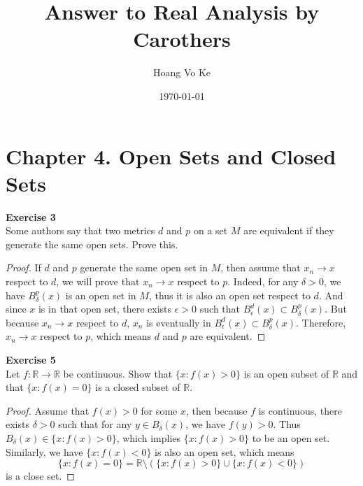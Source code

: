 \documentclass[12pt, a4paper]{article}
\title{Answer to Real Analysis by Carothers}
\author{Hoang Vo Ke}
\date{\today}
\theoremstyle{plain}
\newcommand{\R}{\mathbb{R}}
\newenvironment{exercise}[2][Exercise]
    { \begin{mdframed}[backgroundcolor=gray!20] \textbf{#1 #2} \\}
    {  \end{mdframed}}
\begin{document}
\maketitle

\section*{Chapter 4. Open Sets and Closed Sets}

\begin{exercise}{3}
Some authors say that two metrics $d$ and $p$ on a set $M$ are equivalent if they generate the same open sets. Prove this.
\end{exercise}
	\begin{proof}
	If $d$ and $p$ generate the same open set in $M$, then assume that $x_n\rightarrow x$ respect to $d$, we will prove that $x_n\rightarrow x$ respect to $p$. Indeed, for any $\delta >0$, we have $B_\delta^p(x)$ is an open set in $M$, thus it is also an open set respect to $d$. And since $x$ is in that open set, there exists $\epsilon >0$ such that $B_\epsilon^d(x)\subset B_\delta^p(x)$. But because $x_n\rightarrow x$ respect to $d$, $x_n$ is eventually in $ B_\epsilon^d(x)\subset B_\delta^p(x)$. Therefore, $x_n\rightarrow x$ respect to $p$, which means $d$ and $p$ are equivalent.
	\end{proof}

\begin{exercise}{5}
Let $f:\R\rightarrow\R$ be continuous. Show that $\{x:f(x)>0\}$ is an open subset of $\R$ and that $\{x:f(x)=0\}$ is a closed subset of $\R$.
\end{exercise}
	\begin{proof}
	Assume that $f(x)>0$ for some $x$, then because $f$ is continuous, there exists $\delta>0$ such that for any $y\in B_\delta(x)$, we have $f(y)>0$. Thus $B_\delta(x)\in \{x:f(x)>0\}$, which implies $\{x:f(x)>0\}$ to be an open set. Similarly, we have $\{x:f(x)<0\}$ is also an open set, which means
	\[
	\{x:f(x)=0\}=\R\setminus (\{x:f(x)>0\}\cup \{x:f(x)<0\})		
	\]
	is a close set.
	\end{proof}
	
\end{document}

